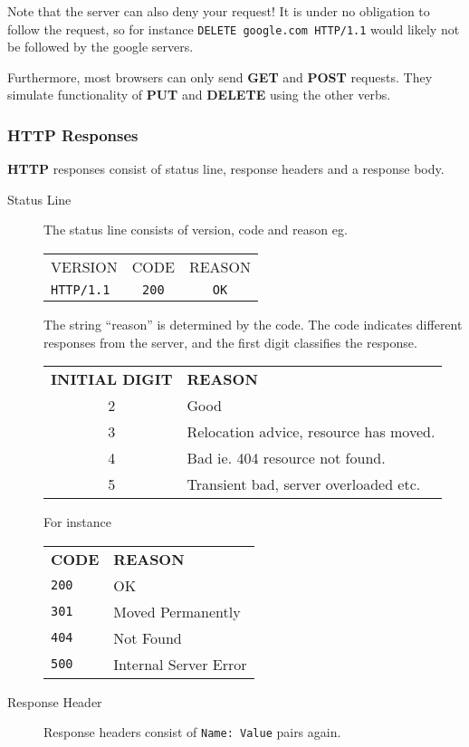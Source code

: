 \documentclass[11pt]{article}
\begin{document}
Note that the server can also deny your request! It is under no obligation to follow the request, so for instance \texttt{DELETE google.com HTTP/1.1} would likely not be followed by the google servers.

Furthermore, most browsers can only send \textbf{GET} and \textbf{POST} requests. They simulate functionality of \textbf{PUT} and \textbf{DELETE} using the other verbs.

\subsubsection{HTTP Responses}

\textbf{HTTP} responses consist of status line, response headers and a response body.
\begin{description}
\item[Status Line]
The status line consists of version, code and reason
eg. 

\begin{tabular}{ l c c }
  VERSION & CODE & REASON \\
  \texttt{HTTP/1.1} & \texttt{200} & \texttt{OK} \\
\end{tabular}
The string ``reason'' is determined by the code. The code indicates different responses from the server, and the first digit classifies the response.

\begin{tabular}{ c l }
  \textbf{INITIAL DIGIT} & \textbf{REASON} \\
  2 & Good \\
  3 & Relocation advice, resource has moved. \\
  4 & Bad ie. 404 resource not found. \\
  5 & Transient bad, server overloaded etc. \\
\end{tabular}

For instance

\begin{tabular}{ l l }
  \textbf{CODE} & \textbf{REASON} \\
  \texttt{200} & OK  \\
  \texttt{301} & Moved Permanently  \\
  \texttt{404} & Not Found  \\
  \texttt{500} & Internal Server Error  \\
\end{tabular}
\item[Response Header]
Response headers consist of \texttt{Name: Value} pairs again.


\end{description}
\end{document}
